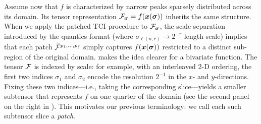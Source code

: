 Assume now that $f$ is characterized by narrow peaks sparsely distributed across its domain. Its tensor representation $\mathcal{F}_{\boldsymbol{\sigma}} = f(\boldsymbol{x}(\boldsymbol{\sigma}))$ inherits the same structure. When we apply the patched TCI procedure to $\mathcal{F}_{\boldsymbol{\sigma}}$, the scale separation introduced by the quantics format (where $\sigma_{\ell(n,r)} \to 2^{-r}$ length scale) implies that each patch $\widetilde{\mathcal{F}}^{p_1,\dots,p_{\bar \ell}}$ simply captures $f(\boldsymbol{x}(\boldsymbol{\sigma}))$ restricted to a distinct sub-region of the original domain.
 makes the idea clearer for a bivariate function.
The tensor $\mathcal{F}$ is indexed by scale: for example, with an interleaved 2-D ordering, the first two indices $\sigma_1$ and $\sigma_2$ encode the resolution $2^{-1}$ in the $x$- and $y$-directions. Fixing these two indices—i.e., taking the corresponding slice—yields a smaller subtensor that represents $f$ on one quarter of the domain (see the second panel on the right in ). This motivates our previous terminology: we call each such subtensor slice a \textit{patch}.

